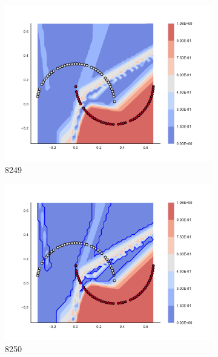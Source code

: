 \begin{figure}[h]
\begin{subfigure}[b]{0.09\textwidth}
    \includegraphics[clip, trim=2.35cm 1.75cm 4.5cm 0cm,width=\textwidth]{img/convergence/8249.pdf}
    \caption{8249}
    \label{fig:convergence_8249}
\end{subfigure}
%
\begin{subfigure}[b]{0.09\textwidth}
    \includegraphics[clip, trim=2.35cm 1.75cm 4.5cm 0cm,width=\textwidth]{img/convergence/8250.pdf}
    \caption{8250}
    \label{fig:convergence_8250}
\end{subfigure}
%
\begin{subfigure}[b]{0.09\textwidth}

\end{subfigure}
\end{figure}
